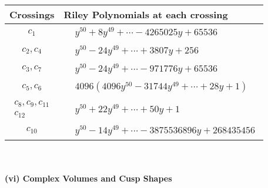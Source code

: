 \documentclass[1p]{elsarticle_modified}
\theoremstyle{definition}
\begin{document}
\begin{tabular}{m{50pt}|m{274pt}}
Crossings & \hspace{64pt}Riley Polynomials at each crossing \\
\hline $$\begin{aligned}c_{1}\end{aligned}$$&$\begin{aligned}
&y^{50}+8 y^{49}+\cdots-4265025 y+65536
\end{aligned}$\\
\hline $$\begin{aligned}c_{2},c_{4}\end{aligned}$$&$\begin{aligned}
&y^{50}-24 y^{49}+\cdots+3807 y+256
\end{aligned}$\\
\hline $$\begin{aligned}c_{3},c_{7}\end{aligned}$$&$\begin{aligned}
&y^{50}-24 y^{49}+\cdots-971776 y+65536
\end{aligned}$\\
\hline $$\begin{aligned}c_{5},c_{6}\end{aligned}$$&$\begin{aligned}
&4096(4096 y^{50}-31744 y^{49}+\cdots+28 y+1)
\end{aligned}$\\
\hline $$\begin{aligned}c_{8},c_{9},c_{11}\\c_{12}\end{aligned}$$&$\begin{aligned}
&y^{50}+22 y^{49}+\cdots+50 y+1
\end{aligned}$\\
\hline $$\begin{aligned}c_{10}\end{aligned}$$&$\begin{aligned}
&y^{50}-14 y^{49}+\cdots-3875536896 y+268435456
\end{aligned}$\\
\hline
\end{tabular}\\~\\
\newpage\flushleft \textbf{(vi) Complex Volumes and Cusp Shapes}
\end{document}
